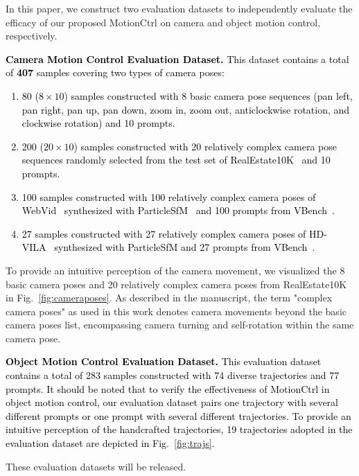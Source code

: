 \documentclass[sigconf]{acmart}
\begin{document}
In this paper, we construct two evaluation datasets to independently evaluate the efficacy of our proposed MotionCtrl on camera and object motion control, respectively. 

\textcolor{black}{
\noindent\textbf{Camera Motion Control Evaluation Dataset.} This dataset contains a total of \textbf{407} samples covering two types of camera poses: 
\begin{enumerate}
    \item 80 ($8 \times 10$) samples constructed with 8 basic camera pose sequences (pan left, pan right, pan up, pan down, zoom in, zoom out, anticlockwise rotation, and clockwise rotation) and 10 prompts.
    \item 200 ($20 \times 10$) samples constructed with 20 relatively complex camera pose sequences randomly selected from the test set of RealEstate10K~\cite{zhou2018stereo} and 10 prompts.
    \item 100 samples constructed with 100 relatively complex camera poses of WebVid~\cite{bain2021frozen} synthesized with ParticleSfM~\cite{zhao2022particlesfm} and 100 prompts from VBench~\cite{huang2023vbench}.
    \item 27 samples constructed with 27 relatively complex camera poses of HD-VILA~\cite{xue2022advancing} synthesized with ParticleSfM and 27 prompts from VBench~\cite{huang2023vbench}.
\end{enumerate}
}
To provide an intuitive perception of the camera movement, we visualized the 8 basic camera poses and 20 relatively complex camera poses from RealEstate10K~\cite{zhou2018stereo} in Fig.~\ref{fig:cameraposes}. As described in the manuscript, the term "complex camera poses" as used in this work denotes camera movements beyond the basic camera poses list, encompassing camera turning and self-rotation within the same camera pose.

\textcolor{black}{
\noindent\textbf{Object Motion Control Evaluation Dataset.} This evaluation dataset contains a total of 283 samples constructed with 74 diverse trajectories and 77 prompts. It should be noted that to verify the effectiveness of MotionCtrl in object motion control, our evaluation dataset pairs one trajectory with several different prompts or one prompt with several different trajectories. To provide an intuitive perception of the handcrafted trajectories, 19 trajectories adopted in the evaluation dataset are depicted in Fig.~\ref{fig:trajs}.
}

These evaluation datasets will be released.
\end{document}
